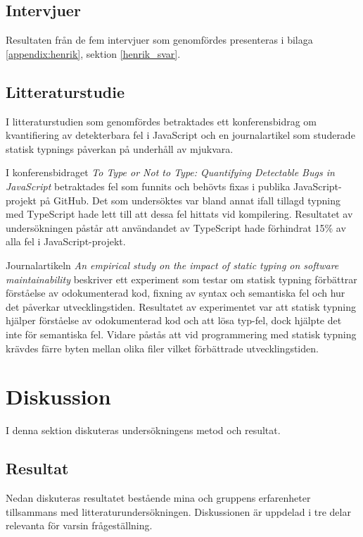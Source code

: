 \subsection{Intervjuer}
Resultaten från de fem intervjuer som genomfördes presenteras i bilaga \ref{appendix:henrik}, sektion \ref{henrik_svar}.
\subsection{Litteraturstudie}
I litteraturstudien som genomfördes betraktades ett konferensbidrag om kvantifiering av detekterbara fel i JavaScript och en journalartikel som studerade statisk typnings påverkan på underhåll av mjukvara.

I konferensbidraget \textit{To Type or Not to Type:
Quantifying Detectable Bugs in JavaScript} \cite{henrik_totypeornot} betraktades fel som funnits och behövts fixas i publika JavaScript-projekt på GitHub. Det som undersöktes var bland annat ifall tillagd typning med TypeScript hade lett till att dessa fel hittats vid kompilering.
Resultatet av undersökningen påstår att användandet av TypeScript hade förhindrat 15\% av alla fel i JavaScript-projekt.

Journalartikeln \textit{An empirical study on the impact of static typing
on software maintainability} \cite{henrik_maintainability} beskriver ett experiment som testar om statisk typning förbättrar förståelse av odokumenterad kod, fixning av syntax och semantiska fel och hur det påverkar utvecklingstiden.
Resultatet av experimentet var att statisk typning hjälper förståelse av odokumenterad kod och att lösa typ-fel, dock hjälpte det inte för semantiska fel. Vidare påstås att vid programmering med statisk typning krävdes färre byten mellan olika filer vilket förbättrade utvecklingstiden.

\section{Diskussion}
I denna sektion diskuteras undersökningens metod och resultat.
\subsection{Resultat}
Nedan diskuteras resultatet bestående mina och gruppens erfarenheter tillsammans med litteraturundersökningen. Diskussionen är uppdelad i tre delar relevanta för varsin frågeställning.
